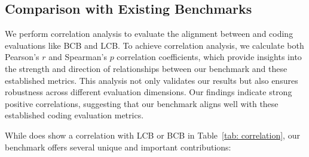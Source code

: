 \subsection{Comparison with Existing Benchmarks}
\label{app_ssec: comparison}
We perform correlation analysis to evaluate the alignment between \benchmark\space and coding evaluations like BCB and LCB.
To achieve correlation analysis, we calculate both Pearson’s $r$ and Spearman’s $p$ correlation coefficients, which provide insights into the strength and direction of relationships between our benchmark and these established metrics. 
This analysis not only validates our results but also ensures robustness across different evaluation dimensions. Our findings indicate strong positive correlations, suggesting that our benchmark aligns well with these established coding evaluation metrics.

\begin{table}[t!]
    \centering
    \caption{Correlation with LCB and BCB.}
    \vspace{-0.3cm}
    \label{tab: correlation}
\end{table}

While \benchmark\space does show a correlation with LCB or BCB in Table~\ref{tab: correlation}, our benchmark offers several unique and important contributions:

